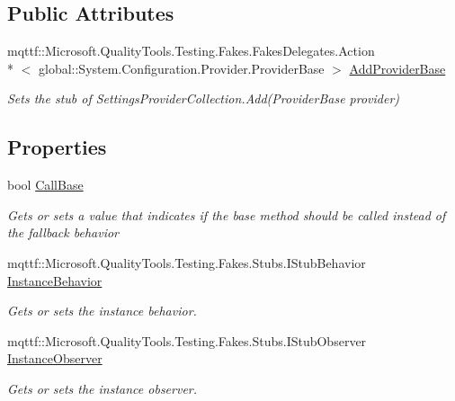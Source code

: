 \subsection*{Public Attributes}
\begin{DoxyCompactItemize}
\item 
mqttf\-::\-Microsoft.\-Quality\-Tools.\-Testing.\-Fakes.\-Fakes\-Delegates.\-Action\\*
$<$ global\-::\-System.\-Configuration.\-Provider.\-Provider\-Base $>$ \hyperlink{class_system_1_1_configuration_1_1_fakes_1_1_stub_settings_provider_collection_a7e4083f1614e24763b5fb9536d6aa3d2}{Add\-Provider\-Base}
\begin{DoxyCompactList}\small\item\em Sets the stub of Settings\-Provider\-Collection.\-Add(\-Provider\-Base provider)\end{DoxyCompactList}\end{DoxyCompactItemize}
\subsection*{Properties}
\begin{DoxyCompactItemize}
\item 
bool \hyperlink{class_system_1_1_configuration_1_1_fakes_1_1_stub_settings_provider_collection_a5db0197ac6d1ca93a977e9af495d9239}{Call\-Base}
\begin{DoxyCompactList}\small\item\em Gets or sets a value that indicates if the base method should be called instead of the fallback behavior\end{DoxyCompactList}\item 
mqttf\-::\-Microsoft.\-Quality\-Tools.\-Testing.\-Fakes.\-Stubs.\-I\-Stub\-Behavior \hyperlink{class_system_1_1_configuration_1_1_fakes_1_1_stub_settings_provider_collection_a74ee3eedc2112bd6ec9b21f3c851beb2}{Instance\-Behavior}
\begin{DoxyCompactList}\small\item\em Gets or sets the instance behavior.\end{DoxyCompactList}\item 
mqttf\-::\-Microsoft.\-Quality\-Tools.\-Testing.\-Fakes.\-Stubs.\-I\-Stub\-Observer \hyperlink{class_system_1_1_configuration_1_1_fakes_1_1_stub_settings_provider_collection_aa120f1e32732fb89ddda2e1c7ffdfe0a}{Instance\-Observer}
\begin{DoxyCompactList}\small\item\em Gets or sets the instance observer.\end{DoxyCompactList}\end{DoxyCompactItemize}


